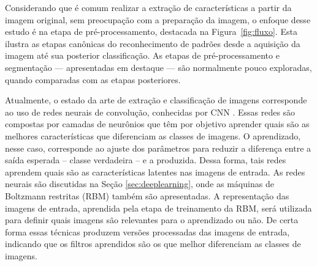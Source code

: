 Considerando que é comum realizar a extração de características a partir da imagem original, sem preocupação com a preparação da imagem, o enfoque desse estudo é na etapa de pré-processamento, destacada na Figura~\ref{fig:fluxo}. Esta ilustra as etapas canônicas do reconhecimento de padrões desde a aquisição da imagem até sua posterior classificação. As etapas de pré-processamento e segmentação --- apresentadas em destaque --- são normalmente pouco exploradas, quando comparadas com as etapas posteriores.

Atualmente, o estado da arte de extração e classificação de imagens corresponde ao uso de redes neurais de convolução, conhecidas por CNN \cite{Schmidhuber2014}. Essas redes são compostas por camadas de neurônios que têm por objetivo aprender quais são as melhores características que diferenciam as classes de imagens. O aprendizado, nesse caso, corresponde ao ajuste dos parâmetros para reduzir a diferença entre a saída esperada -- classe verdadeira -- e a produzida. Dessa forma, tais redes aprendem quais são as características latentes nas imagens de entrada. As redes neurais são discutidas na Seção \ref{sec:deeplearning}, onde as máquinas de Boltzmann restritas (RBM) também são apresentadas. A representação das imagens de entrada, aprendida pela etapa de treinamento da RBM, será utilizada para definir quais imagens são relevantes para o aprendizado ou não. De certa forma essas técnicas produzem versões processadas das imagens de entrada, indicando que os filtros aprendidos são os que melhor diferenciam as classes de imagens.

